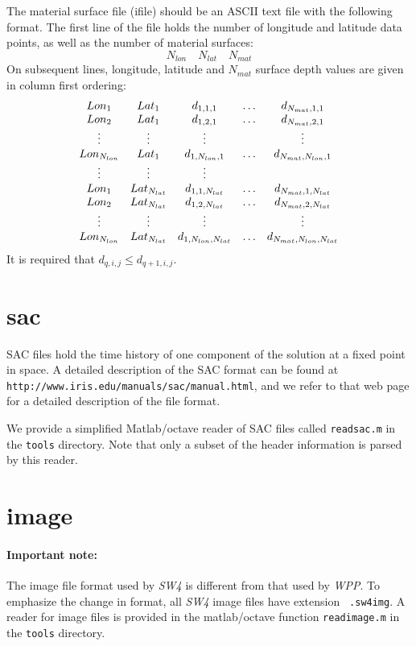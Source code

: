 \documentclass[11pt]{report}
\begin{document}
The material surface file (ifile) should be an ASCII text file with the following format. The first line of the
file holds the number of longitude and latitude data points, as well as the number of material
surfaces:
\[
N_{lon}\quad N_{lat}\quad N_{mat}
\]
On subsequent lines, longitude, latitude and $N_{mat}$ surface depth values are given in column
first ordering:
\[
\begin{array}{c c c c c}
Lon_1 & Lat_1          & d_{1,1,1} & \ldots & d_{N_{mat},1,1}\\
Lon_2& Lat_1           & d_{1,2,1} & \ldots & d_{N_{mat},2,1}\\
\vdots&\vdots&\vdots & & \vdots\\
Lon_{N_{lon}}& Lat_1      & d_{1,N_{lon},1} & \ldots & d_{N_{mat},N_{lon},1}\\
\vdots&\vdots&\vdots\\
Lon_1 & Lat_{N_{lat}}     & d_{1,1,N_{lat}} & \ldots & d_{N_{mat},1,N_{lat}}\\
Lon_2& Lat_{N_{lat}}      & d_{1,2,N_{lat}} & \ldots & d_{N_{mat},2,N_{lat}}\\
\vdots&\vdots&\vdots & & \vdots\\
Lon_{N_{lon}}& Lat_{N_{lat}} & d_{1,N_{lon},N_{lat}} & \ldots & d_{N_{mat},N_{lon},N_{lat}}
\end{array}
\]
It is required that $d_{q,i,j} \leq d_{q+1,i,j}$.

\section{sac}\label{sec:sac-format}

SAC files hold the time history of one component of the solution at a fixed point in space.  A
detailed description of the SAC format can be found at {\tt
http://www.iris.edu/manuals/sac/manual.html}, and we refer to that web page for a detailed
description of the file format.

We provide a simplified Matlab/octave reader of SAC files called {\tt readsac.m} in the {\tt tools}
directory. Note that only a subset of the header information is parsed by this reader.

\section{image}\label{sec:image-format}

\paragraph{Important note:} The image file format used by \emph{SW4} is different from that used by
\emph{WPP}. To emphasize the change in format, all \emph{SW4} image files have extension {\tt
  .sw4img}. A reader for image files is provided in the matlab/octave function \verb+readimage.m+ in
the \verb+tools+ directory.
\end{document}
